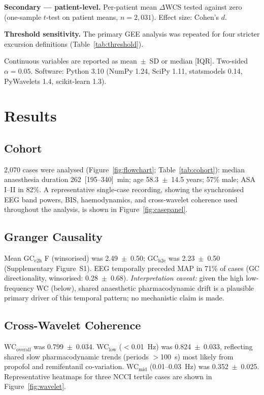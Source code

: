 \documentclass[fleqn,10pt,lineno]{wlpeerj}
\begin{document}
\textbf{Secondary --- patient-level.} Per-patient mean $\Delta$WCS tested against zero
(one-sample $t$-test on patient means, $n = 2{,}031$). Effect size: Cohen's $d$.

\textbf{Threshold sensitivity.} The primary GEE analysis was repeated for four stricter
excursion definitions (Table~\ref{tab:threshold}).

Continuous variables are reported as mean~$\pm$~SD or median [IQR]. Two-sided $\alpha = 0.05$.
Software: Python 3.10 (NumPy 1.24, SciPy 1.11, statsmodels 0.14, PyWavelets 1.4,
scikit-learn 1.3).

\section{Results}

\subsection{Cohort}

2,070 cases were analysed (Figure~\ref{fig:flowchart}; Table~\ref{tab:cohort}): median
anaesthesia duration 262~[195--340]~min; age 58.3~$\pm$~14.5 years; 57\% male; ASA I--II in
82\%. A representative single-case recording, showing the synchronised EEG band powers, BIS,
haemodynamics, and cross-wavelet coherence used throughout the analysis, is shown in
Figure~\ref{fig:casepanel}.

\subsection{Granger Causality}

Mean GC$_\text{e2h}$ F (winsorised) was 2.49~$\pm$~0.50; GC$_\text{h2e}$ was 2.23~$\pm$~0.50
(Supplementary Figure~S1).
EEG temporally preceded MAP in 71\% of cases (GC directionality, winsorised:
0.28~$\pm$~0.68). \textit{Interpretation caveat:} given the high low-frequency WC (below),
shared anaesthetic pharmacodynamic drift is a plausible primary driver of this temporal
pattern; no mechanistic claim is made.

\subsection{Cross-Wavelet Coherence}

WC$_\text{overall}$ was 0.799~$\pm$~0.034. WC$_\text{low}$ ($<$0.01~Hz) was 0.824~$\pm$~0.033,
reflecting shared slow pharmacodynamic trends (periods $>$100~s) most likely from propofol and
remifentanil co-variation. WC$_\text{mid}$ (0.01--0.03~Hz) was 0.352~$\pm$~0.025.
Representative heatmaps for three NCCI tertile cases are shown in Figure~\ref{fig:wavelet}.
\end{document}

